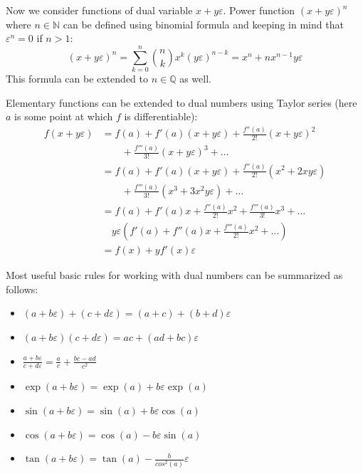 \documentclass[reprint,amsmath,amssymb,aps,pre,showkeys,showpacs]{revtex4-1}
\begin{document}
Now we consider functions of dual variable $x + y\varepsilon$. Power function
$(x + y\varepsilon)^n$ where $n \in \mathbb{N}$ can be defined using binomial
formula and keeping in mind that $\varepsilon^n = 0$ if $n>1$:
\begin{equation*}
  (x + y\varepsilon)^n = \sum_{k=0}^n \binom{n}{k} x^k (y\varepsilon)^{n-k} =
  x^n + n x^{n-1} y \varepsilon
\end{equation*}
This formula can be extended to $n \in \mathbb{Q}$ as well.

Elementary functions can be extended to dual numbers using Taylor series (here
$a$ is some point at which $f$ is differentiable):
\begin{align*}
  f(x + y\varepsilon) &= f(a) + f'(a)(x + y\varepsilon) + \frac{f''(a)}{2!}(x + y\varepsilon)^2 \\
  & \qquad + \frac{f'''(a)}{3!}(x + y\varepsilon)^3 + \dots \\
  &= f(a) + f'(a)(x + y\varepsilon) + \frac{f''(a)}{2!}(x^2 + 2xy\varepsilon) \\
  & \qquad + \frac{f'''(a)}{3!}(x^3 + 3x^2y\varepsilon) + \dots \\
  &= f(a) + f'(a)x + \frac{f''(a)}{2!}x^2 + \frac{f'''(a)}{3!}x^3 + \dots \\
  & \quad y\varepsilon(f'(a) + f''(a)x + \frac{f'''(a)}{2!}x^2 + \dots) \\
  &= f(x) + yf'(x)\varepsilon
\end{align*}

Most useful basic rules for working with dual numbers can be summarized as follows:
\begin{itemize}
\item $(a + b\varepsilon) + (c + d\varepsilon) = (a + c) + (b + d)\varepsilon$
\item $(a + b\varepsilon) (c + d\varepsilon) = ac + (ad + bc)\varepsilon$
\item $\frac{a + b\varepsilon}{c + d\varepsilon} = \frac{a}{c} + \frac{bc - ad}{c^2}$
\item $\exp(a + b\varepsilon) = \exp(a) + b\varepsilon\exp(a)$
\item $\sin(a + b\varepsilon) = \sin(a) + b\varepsilon\cos(a)$
\item $\cos(a + b\varepsilon) = \cos(a) - b\varepsilon\sin(a)$
\item $\tan(a + b\varepsilon) = \tan(a) - \frac{b}{cos^2(a)}\varepsilon$
\end{itemize}
\end{document}
